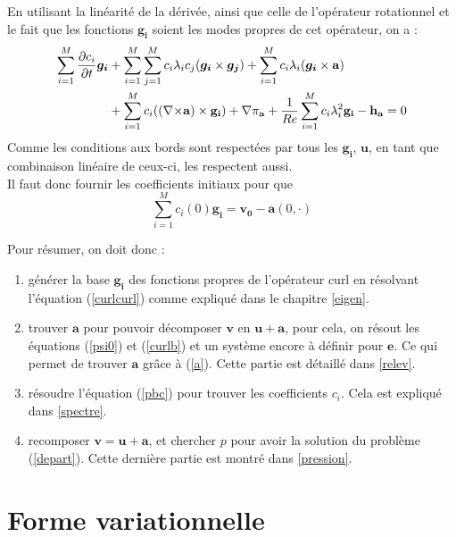 En utilisant la linéarité de la dérivée, ainsi que celle de l'opérateur rotationnel et le fait que les fonctions $\bm{g_i}$ soient les modes propres de cet opérateur, on a :
\begin{equation}\label{pbc}
\begin{aligned}
\sum_{i=1}^M\frac{\partial c_i}{\partial t}\bm{g_i} &+ \sum_{i=1}^M\sum_{j=1}^Mc_i\lambda_ic_j(\bm{g_i}\times \bm{g_j}) + \sum_{i=1}^Mc_i\lambda_i(\bm{g_i}\times \mathbf{a})\\
& +  \sum_{i=1}^Mc_i(({\nabla\times}\mathbf{a})\times \mathbf{g_i}) + {\nabla} \pi_{\mathbf{a}} +\frac{1}{Re}\sum_{i=1}^Mc_i\lambda_i^2\mathbf{g_i} - \mathbf{h_a} = 0\\
\end{aligned}\end{equation}
Comme les conditions aux bords sont respectées par tous les $\bm{g_i}$, $\bm{u}$, en tant que combinaison linéaire de ceux-ci, les respectent aussi.\\
Il faut donc fournir les coefficients initiaux pour que 
\[ \sum_{i=1}^M c_i(0)\bm{g_i} = \bm{v_0}-\bm{a}(0,\cdot) \]

Pour résumer, on doit donc :
\begin{enumerate}
\item générer la base $\mathbf{g_i}$ des fonctions propres de l'opérateur curl en résolvant l'équation (\ref{curlcurl}) comme expliqué dans le chapitre \ref{eigen}.
\item trouver $\mathbf{a}$ pour pouvoir décomposer $\mathbf{v}$ en $\mathbf{u}+\mathbf{a}$, pour cela, on résout les équations (\ref{psi0}) et (\ref{curlb}) et un système encore à définir pour $\bm{e}$. Ce qui permet de trouver $\mathbf{a}$ grâce à (\ref{a}). Cette partie est détaillé dans \ref{relev}.
\item résoudre l'équation (\ref{pbc}) pour trouver les coefficients $c_i$. Cela est expliqué dans \ref{spectre}.
\item recomposer $\mathbf{v}=\mathbf{u}+\mathbf{a}$, et chercher $p$ pour avoir la solution du problème (\ref{depart}). Cette dernière partie est montré dans \ref{pression}.
\end{enumerate}

\chapter{Forme variationnelle}
\label{fv}
